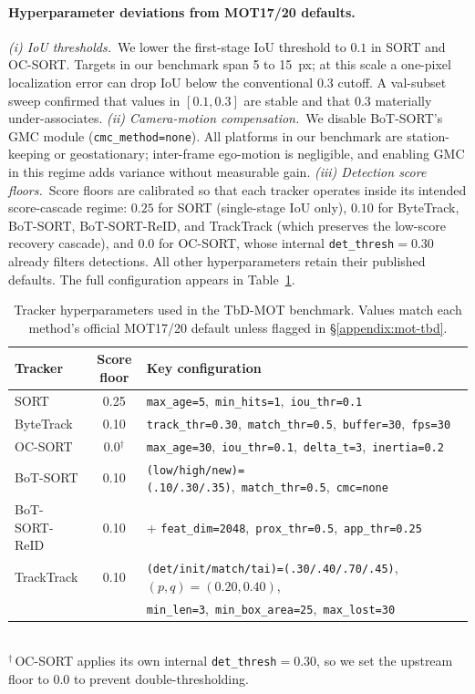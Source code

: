 \documentclass{article}
\begin{document}
\paragraph{Hyperparameter deviations from MOT17/20 defaults.}
\emph{(i) IoU thresholds.}~We lower the first-stage IoU threshold
to $0.1$ in SORT and OC-SORT. Targets in our benchmark span 5 to
15~px; at this scale a one-pixel localization error can drop IoU
below the conventional $0.3$ cutoff. A val-subset sweep confirmed
that values in $[0.1, 0.3]$ are stable and that $0.3$ materially
under-associates.
\emph{(ii) Camera-motion compensation.}~We disable BoT-SORT's GMC
module (\texttt{cmc\_method=none}). All platforms in our benchmark
are station-keeping or geostationary; inter-frame ego-motion is
negligible, and enabling GMC in this regime adds variance without
measurable gain.
\emph{(iii) Detection score floors.}~Score floors are calibrated so
that each tracker operates inside its intended score-cascade
regime: $0.25$ for SORT (single-stage IoU only), $0.10$ for
ByteTrack, BoT-SORT, BoT-SORT-ReID, and TrackTrack (which preserves
the low-score recovery cascade), and $0.0$ for OC-SORT, whose
internal \texttt{det\_thresh}$=0.30$ already filters detections.
All other hyperparameters retain their published defaults. The full
configuration appears in Table~\ref{tab:mot-hparams}.

\begin{table}[h]
\centering
\caption{Tracker hyperparameters used in the TbD-MOT benchmark.
Values match each method's official MOT17/20 default unless flagged
in \S\ref{appendix:mot-tbd}.}
\label{tab:mot-hparams}
\small
\setlength{\tabcolsep}{4pt}
\begin{tabular}{l c l}
\toprule
Tracker & Score floor & Key configuration \\
\midrule
SORT          & 0.25            & \texttt{max\_age=5},\ \texttt{min\_hits=1},\ \texttt{iou\_thr=0.1} \\
ByteTrack     & 0.10            & \texttt{track\_thr=0.30},\ \texttt{match\_thr=0.5},\ \texttt{buffer=30},\ \texttt{fps=30} \\
OC-SORT       & 0.0$^{\dagger}$ & \texttt{max\_age=30},\ \texttt{iou\_thr=0.1},\ \texttt{delta\_t=3},\ \texttt{inertia=0.2} \\
BoT-SORT      & 0.10            & \texttt{(low/high/new)=(.10/.30/.35)},\ \texttt{match\_thr=0.5},\ \texttt{cmc=none} \\
BoT-SORT-ReID & 0.10            & + \texttt{feat\_dim=2048},\ \texttt{prox\_thr=0.5},\ \texttt{app\_thr=0.25} \\
TrackTrack    & 0.10            & \texttt{(det/init/match/tai)=(.30/.40/.70/.45)},\ $(p,q)=(0.20,0.40)$, \\
              &                 & \texttt{min\_len=3},\ \texttt{min\_box\_area=25},\ \texttt{max\_lost=30} \\
\bottomrule
\end{tabular}
\\[2pt]
{\footnotesize $^{\dagger}$\,OC-SORT applies its own internal
\texttt{det\_thresh}$=0.30$, so we set the upstream floor to $0.0$
to prevent double-thresholding.}
\end{table}
\end{document}
